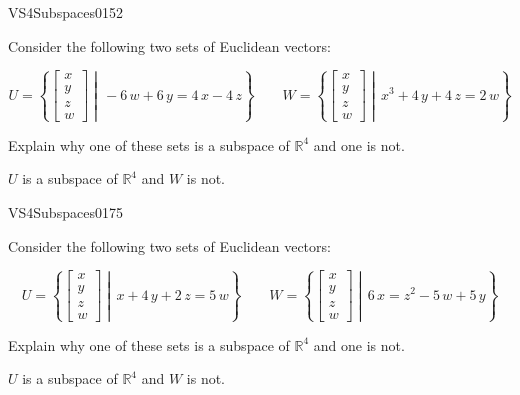 \begin{exercise}{VS4}{Subspaces}{0152} 
\begin{exerciseStatement} 

Consider the following two sets of Euclidean vectors: 

 \[
          U=\left\{ \left[\begin{array}{c}
x \\
y \\
z \\
w
\end{array}\right] \middle|\,-6 \, w + 6 \, y = 4 \, x - 4 \, z\right\} \hspace{2em}  W=\left\{ \left[\begin{array}{c}
x \\
y \\
z \\
w
\end{array}\right] \middle|\,x^{3} + 4 \, y + 4 \, z = 2 \, w\right\}
    \] 

 Explain why one of these sets is a subspace of \(\mathbb{R}^4\) and one is not. 

 \end{exerciseStatement}
 \begin{exerciseAnswer} 

\(U\) is a subspace of \(\mathbb{R}^4\) and \(W\) is not.

 \end{exerciseAnswer}
 \end{exercise}


\newpage




\begin{exercise}{VS4}{Subspaces}{0175} 
\begin{exerciseStatement} 

Consider the following two sets of Euclidean vectors: 

 \[
          U=\left\{ \left[\begin{array}{c}
x \\
y \\
z \\
w
\end{array}\right] \middle|\,x + 4 \, y + 2 \, z = 5 \, w\right\} \hspace{2em}  W=\left\{ \left[\begin{array}{c}
x \\
y \\
z \\
w
\end{array}\right] \middle|\,6 \, x = z^{2} - 5 \, w + 5 \, y\right\}
    \] 

 Explain why one of these sets is a subspace of \(\mathbb{R}^4\) and one is not. 

 \end{exerciseStatement}
 \begin{exerciseAnswer} 

\(U\) is a subspace of \(\mathbb{R}^4\) and \(W\) is not.

 \end{exerciseAnswer}
 \end{exercise}



